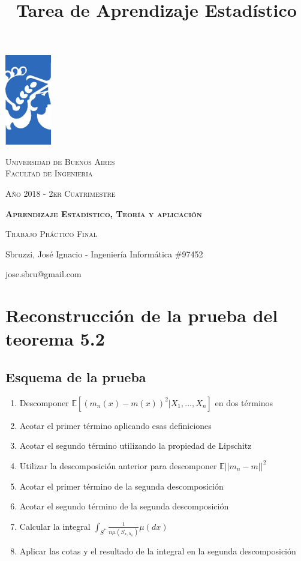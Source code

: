 \documentclass[12pt, a4paper]{article}
\title{Tarea de Aprendizaje Estadístico}
\author{}
\date{}
\begin{document}
\begin{titlepage} %
	\centering
	  \includegraphics[width=0.15\textwidth]{FIUBA_logo}\par
	  {\scshape\Large Universidad de Buenos Aires
      \\ Facultad de Ingenieria \par}
      {\scshape\small Año 2018 - 2er Cuatrimestre \par}
	  \vspace{1cm}
	  {\scshape\bfseries\LARGE Aprendizaje Estadístico, Teoría y aplicación\par}
	  \vspace{0.5cm}
	  \vspace{1cm}
      {\scshape\large Trabajo Práctico Final \par}
      \vspace{0.5cm
      \raggedright}
      \vspace{0.5cm}
    \centering
	  {\normalsize Sbruzzi, José Ignacio - Ingeniería Informática \#97452 \par}
      {\small  jose.sbru@gmail.com \par}
\end{titlepage} %
\newpage
\tableofcontents
\newpage
\section{Reconstrucción de la prueba del teorema 5.2}
\subsection{Esquema de la prueba}

\begin{enumerate}
  \item Descomponer $ \mathds{E}[ (m_n(x) - m(x))^2 | X_1, ..., X_n] $ en dos términos
  \item Acotar el primer término aplicando esas definiciones
  \item Acotar el segundo término utilizando la propiedad de Lipschitz
  \item Utilizar la descomposición anterior para descomponer $\mathds{E}|| m_n -m ||^2$
  \item Acotar el primer término de la segunda descomposición
  \item Acotar el segundo término de la segunda descomposición
  \item Calcular la integral $\int_{S^{*}} \frac{1}{n\mu(S_{x,h_n})} \mu(dx) $
  \item Aplicar las cotas y el resultado de la integral en la segunda descomposición 
\end{enumerate}
\end{document}
